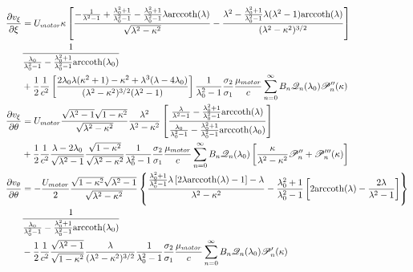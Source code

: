 \documentclass[fontsize=11pt, %
                             paper=a4, %
                             twoside, %
                             captions=tableheading,
                             index=totoc,
                             hyperref]{labbook}
\begin{document}
\begin{equation}
\begin{aligned}
\frac{\partial v_\xi}{\partial \xi}&=U_{motor}\kappa\left[\frac{-\frac{1}{\lambda^2-1}+\frac{\lambda_0^2+1}{\lambda_0^2-1}-\frac{\lambda_0^2+1}{\lambda_0^2-1}\lambda \mathrm{arccoth}(\lambda)}{\sqrt{\lambda^2-\kappa^2}}-\frac{\lambda^2-\frac{\lambda_0^2+1}{\lambda_0^2-1}\lambda(\lambda^2-1)\mathrm{arccoth}(\lambda)}{(\lambda^2-\kappa^2)^{3/2}}\right]\\
&\frac{1}{\frac{\lambda_0}{\lambda_0^2-1}-\frac{\lambda_0^2+1}{\lambda_0^2-1}\mathrm{arccoth}(\lambda_0)}\\
&+\frac{1}{2}\frac{1}{c^2}\left[\frac{2\lambda_0\lambda(\kappa^2+1)-\kappa^2+\lambda^3(\lambda-4\lambda_0)}{(\lambda^2-\kappa^2)^{3/2}(\lambda^2-1)}\right]\frac{1}{\lambda_0^2-1}\frac{\sigma_2}{\sigma_1}\frac{\mu_{motor}}{c}\sum_{n=0}^\infty B_n \mathscr{Q}_n(\lambda_0)\mathscr{P}_n^{\prime\prime}(\kappa)\\
\frac{\partial v_\xi}{\partial \theta}&=U_{motor}\frac{\sqrt{\lambda^2-1}\sqrt{1-\kappa^2}}{\sqrt{\lambda^2-\kappa^2}}\frac{\lambda^2}{\lambda^2-\kappa^2}\left[\frac{\frac{\lambda}{\lambda^2-1}-\frac{\lambda_0^2+1}{\lambda_0^2-1}\mathrm{arccoth}(\lambda)}{\frac{\lambda_0}{\lambda_0^2-1}-\frac{\lambda_0^2+1}{\lambda_0^2-1}\mathrm{arccoth}(\lambda_0)}\right]\\
&+\frac{1}{2}\frac{1}{c^2}\frac{\lambda-2\lambda_0}{\sqrt{\lambda^2-1}}\frac{\sqrt{1-\kappa^2}}{\sqrt{\lambda^2-\kappa^2}}\frac{1}{\lambda_0^2-1}\frac{\sigma_2}{\sigma_1}\frac{\mu_{motor}}{c}\sum_{n=0}^\infty B_n \mathscr{Q}_n(\lambda_0)\left[\frac{\kappa}{\lambda^2-\kappa^2}\mathscr{P}_n^{\prime\prime}+\mathscr{P}_n^{\prime\prime\prime}(\kappa)\right]\\
\frac{\partial v_\theta}{\partial \theta}&=-\frac{U_{motor}}{2}\frac{\sqrt{1-\kappa^2}\sqrt{\lambda^2-1}}{\sqrt{\lambda^2-\kappa^2}}\left\{\frac{\frac{\lambda_0^2+1}{\lambda_0^2-1}\lambda\left[2\lambda\mathrm{arccoth}(\lambda)-1\right]-\lambda}{\lambda^2-\kappa^2}-\frac{\lambda_0^2+1}{\lambda_0^2-1}\left[2\mathrm{arccoth}(\lambda)-\frac{2\lambda}{\lambda^2-1}\right]\right\}\\
&\frac{1}{\frac{\lambda_0}{\lambda_0^2-1}-\frac{\lambda_0^2+1}{\lambda_0^2-1}\mathrm{arccoth}(\lambda_0)}\\
&-\frac{1}{2}\frac{1}{c^2}\frac{\sqrt{\lambda^2-1}}{\sqrt{1-\kappa^2}}\frac{\lambda}{(\lambda^2-\kappa^2)^{3/2}}\frac{1}{\lambda_0^2-1}\frac{\sigma_2}{\sigma_1}\frac{\mu_{motor}}{c}\sum_{n=0}^\infty B_n \mathscr{Q}_n(\lambda_0)\mathscr{P}_n^\prime(\kappa)\\
\end{aligned}
\end{equation}
\end{document}
